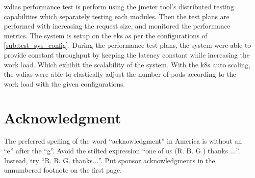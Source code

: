 \documentclass[conference]{IEEEtran}
\begin{document}
\acrshort{wdias} performance test is perform using the \acrshort{jmeter} tool's distributed testing capabilities which separately testing each modules. Then the test plans are performed with increasing the request size, and monitored the performance metrics. The system is setup on the \acrfull{eks} as per the configurations of \ref{sub:test_sys_config}.
During the performance test plans, the system were able to provide constant throughput by keeping the latency constant while increasing the work load. Which exhibit the scalability of the system.
With the \acrshort{k8s} auto scaling, the \acrshort{wdias} were able to elastically adjust the number of pods according to the work load with the given configurations.

\section*{Acknowledgment}

The preferred spelling of the word ``acknowledgment'' in America is without 
an ``e'' after the ``g''. Avoid the stilted expression ``one of us (R. B. 
G.) thanks $\ldots$''. Instead, try ``R. B. G. thanks$\ldots$''. Put sponsor 
acknowledgments in the unnumbered footnote on the first page.


\graphicspath{ {./images/} }



\end{document}
